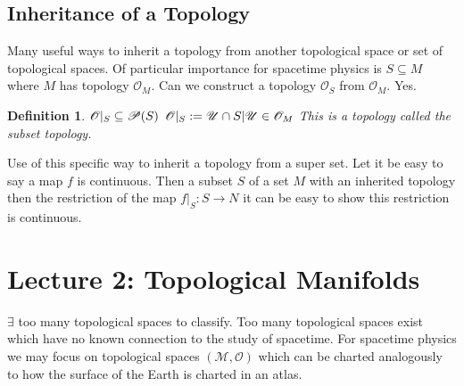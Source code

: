 \documentclass[10pt, oneside]{article}
\newcommand{\M}{\mathcal{M}}
\newtheorem{defn}{Definition}
\begin{document}
  \subsection*{Inheritance of a Topology}
     Many useful ways to inherit a topology from another topological space or set of topological spaces. Of particular importance for spacetime physics is $S \subseteq M$ where $M$ has topology $\mathcal{O}_M$.
     Can we construct a topology $\mathcal{O}_S$ from $\mathcal{O}_M$. Yes.
     \begin{defn}
        $\mathcal{O} |_S \subseteq \mathcal{P}(S) \\$
        $\mathcal{O}|_S := {\mathcal{U} \cap S | \mathcal{U} \in \mathcal{O}_M} \\$
        This is a topology called the subset topology.
     \end{defn}
     Use of this specific way to inherit a topology from a super set. Let it be easy to say a map $f$ is continuous. Then a subset $S$ of a set $M$ with an inherited topology then the restriction of the map $f|_S: S \to N$ it can be easy to show this restriction is continuous.
\section*{Lecture 2: Topological Manifolds}
     $\exists$ too many topological spaces to classify. Too many topological spaces exist which have no known connection to the study of spacetime. For spacetime physics we may focus on topological spaces $(\M,\mathcal{O})$ which can be charted analogously to how the surface of the Earth is charted in an atlas.
\end{document}
